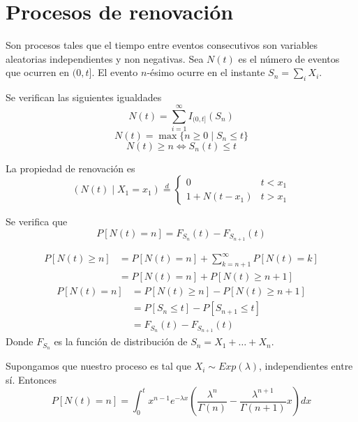 \documentclass[PREyA.tex]{subfiles}
\begin{document}
\section{Procesos de renovación}
\begin{defi}Son procesos tales que el tiempo entre eventos consecutivos son variables aleatorias independientes y non negativas. Sea $N(t)$ es el número de eventos que ocurren en $(0,t]$. El evento $n$-ésimo ocurre en el instante $S_n = \sum_i X_i$.
\end{defi}
\begin{prop}Se verifican las siguientes igualdades
$$
N(t)=\sum_{i=1}^\infty I_{(0,t]}(S_n)
$$
$$
N(t)= \max\{n\geq0 \mid S_n \leq t\}
$$
$$
N(t)\geq n \Leftrightarrow S_n(t)\leq t
$$
\end{prop}
\begin{defi}
La propiedad de renovación es
$$
\left(N(t)\mid X_1 = x_1\right) \overset{d}{=} \begin{cases}
0 & t<x_1\\
1+N(t-x_1) & t>x_1
\end{cases}
$$
\end{defi}
\begin{prop} Se verifica que
$$
P[N(t)=n] = F_{S_n}(t)-F_{S_{n+1}}(t)
$$
\end{prop}
\begin{dem}
\begin{align*}
P[N(t)\geq n] &= P[N(t) = n] + \sum_{k=n+1}^\infty P[N(t)=k]\\
&= P[N(t)=n]+ P[N(t)\geq n+1]
\end{align*}
\begin{align*}
P[N(t)=n] &= P[N(t)\geq n]-P[N(t)\geq n+1]\\
&=P[S_n\leq t]-P[S_{n+1}\leq t]\\
&=F_{S_n}(t)-F_{S_{n+1}}(t)
\end{align*}
Donde $F_{S_n}$ es la función de distribución de $S_n = X_1+\dotsc + X_n$. 
\end{dem}
\begin{example}
Supongamos que nuestro proceso es tal que  $X_i \sim Exp(\lambda)$, independientes entre sí. Entonces
$$
P[N(t)=n] = \int_0^tx^{n-1}e^{-\lambda x}\left(\frac{\lambda^n}{\Gamma(n)}-\frac{\lambda^{n+1}}{\Gamma(n+1)}x\right)dx
$$
\end{example}
\end{document}
